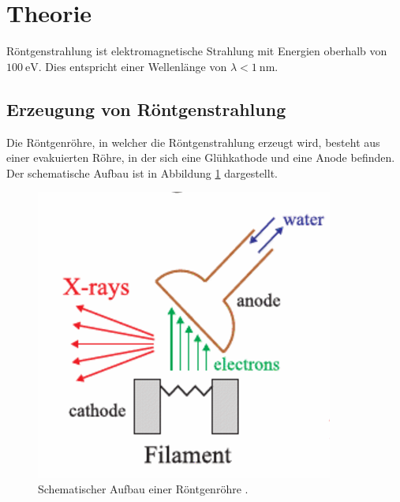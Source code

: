 \section{Theorie}
\label{sec:Theorie}


Röntgenstrahlung ist elektromagnetische Strahlung mit Energien oberhalb von $\SI{100}{\electronvolt}$.
Dies entspricht einer Wellenlänge von $\lambda < \SI{1}{\nano\meter}$.

\subsection{Erzeugung von Röntgenstrahlung}
Die Röntgenröhre, in welcher die Röntgenstrahlung erzeugt wird, besteht aus einer evakuierten Röhre, 
in der sich eine Glühkathode und eine Anode befinden.
Der schematische Aufbau ist in Abbildung \ref{fig:roentgenroehre} dargestellt.

\begin{figure}[H]
    \centering
    \includegraphics[scale=0.5]{Bilder/tube.png}
    \caption{Schematischer Aufbau einer Röntgenröhre \cite{als-nielsen2011}.}
    \label{fig:roentgenroehre}
\end{figure}

